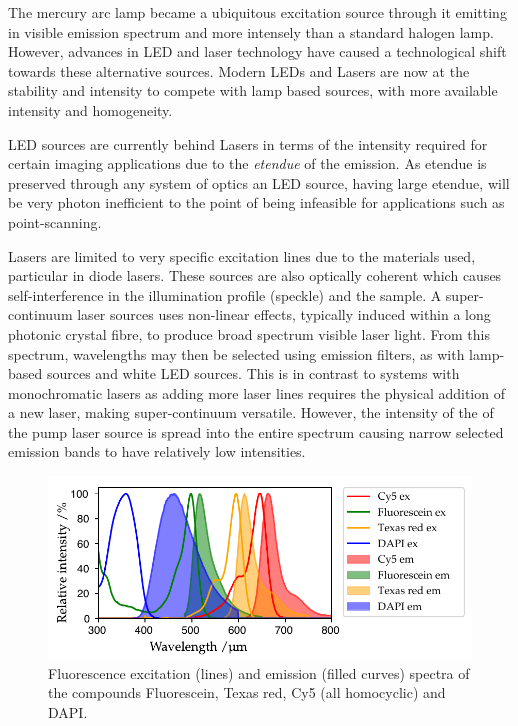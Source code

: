 The mercury arc lamp became a ubiquitous excitation source through it emitting in visible emission spectrum and more intensely than a standard halogen lamp.
However, advances in LED and laser technology have caused a technological shift towards these alternative sources.
Modern LEDs and Lasers are now at the stability and intensity to compete with lamp based sources, with more available intensity and homogeneity.

LED sources are currently behind Lasers in terms of the intensity required for certain imaging applications due to the \emph{etendue} of the emission.
As etendue is preserved through any system of optics an LED source, having large etendue, will be very photon inefficient to the point of being infeasible for applications such as point-scanning.

Lasers are limited to very specific excitation lines due to the materials used, particular in diode lasers.
These sources are also optically coherent which causes self-interference in the illumination profile (speckle) and the sample.
A super-continuum laser sources uses non-linear effects, typically induced within a long photonic crystal fibre, to produce broad spectrum visible laser light.
From this spectrum, wavelengths may then be selected using emission filters, as with lamp-based sources and white LED sources.
This is in contrast to systems with monochromatic lasers as adding more laser lines requires the physical addition of a new laser, making super-continuum versatile.
However, the intensity of the of the pump laser source is spread into the entire spectrum causing narrow selected emission bands to have relatively low intensities.

\begin{figure}
    \centering
    \includegraphics{./fluorphores/++multi_plot.pdf}
    \caption{Fluorescence excitation (lines) and emission (filled curves) spectra of the compounds Fluorescein, Texas red, Cy5 (all homocyclic) and DAPI.}
    \label{fig:fluo_spectra}
\end{figure}

